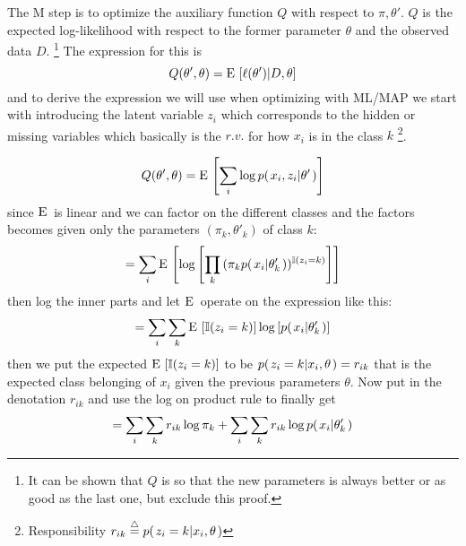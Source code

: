 \documentclass[a4paper,twoside=false,abstract=false,numbers=noenddot,
titlepage=false,headings=small,parskip=half,version=last]{scrartcl}
\begin{document}
\begin{solution}
    The M step is to optimize the auxiliary function $Q$ with respect to
    $\pi,\theta'$. $Q$ is the expected log-likelihood with respect to the former
    parameter $\theta$ and the observed data $D$. 
    \footnote{It can be shown that $Q$ is so that the new parameters is always
    better or as good as the last one, but exclude this proof.}
    The expression for this is
    \begin{equation}
        Q(\theta', \theta) = {\rm E}\,\left[\ell(\theta')|D,\theta\right]
    \end{equation}
    and to derive the expression we will use when optimizing with ML/MAP we start
    with introducing the latent variable $z_i$ which corresponds to the
    hidden or missing
    variables which basically is the $r.v.$ for how $x_i$
    is in the class $k$ \footnote{Responsibility $r_{ik}\eqdef
    \cprob{z_i=k}{x_i,\theta}$}.
    
    \begin{equation}
       Q(\theta', \theta) = 
       {\rm E}\,\left[\sum\limits_i\log p{(\left. x_i,z_i \middle\vert \theta' \right.)}\right] 
    \end{equation}
    since ${\rm E}\,$ is linear and we can factor on the different classes and
    the factors becomes given only the parameters $(\pi_k,\theta'_k)$ of class $k$:
    \begin{equation}
       =\sum\limits_i{\rm E}\, \left[ 
            \log\left[
                \prod\limits_k{(
                    \pi_kp{(\left. x_i \middle\vert \theta'_k \right.)}
                )^{\mathbb{I}(z_i=k)}} 
            \right]
        \right] 
    \end{equation}
    then log the inner parts and let ${\rm E}\,$ operate on the expression like
    this:
    \begin{equation}
        =\sum\limits_i\sum\limits_k{\rm E}\,
            \left[
                \mathbb{I}(z_i=k)
            \right]
            \log\left[
                p{(\left. x_i \middle\vert \theta'_k \right.)}
            \right]
    \end{equation}
    then we put the expected ${\rm E}\,\left[\mathbb{I}(z_i=k)\right]$ to be
    $p{(\left. z_i=k \middle\vert x_i,\theta \right.)}=r_{ik}$ that is the expected class belonging of
    $x_i$ given the previous parameters $\theta$.
    Now put in the denotation $r_{ik}$ and use the log on product rule to
    finally get
    \begin{equation}
        = \sum\limits_i \sum\limits_k {r_{ik}\log \pi_k} +
        \sum\limits_i \sum\limits_k r_{ik} \log p{(\left. x_i \middle\vert \theta'_k \right.)}
    \end{equation}
    

\end{solution}
\end{document}
